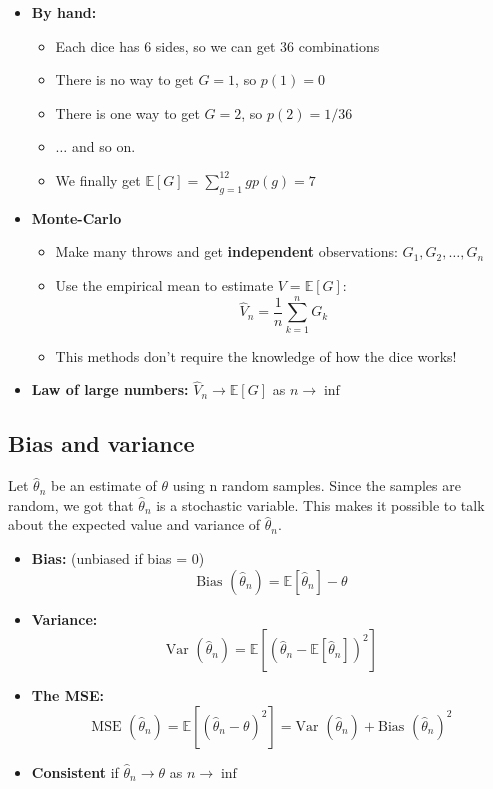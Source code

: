 \begin{itemize}
	\item \textbf{By hand:}
	\begin{itemize}
		\item Each dice has 6 sides, so we can get 36 combinations
		\item There is no way to get $G=1$, so $p(1)=0$
		\item There is one way to get $G=2$, so $p(2) = 1/36$
		\item $\ldots$ and so on. 
		\item We finally get $\mathbb{E}[G] = \sum_{g=1}^{12}gp(g) = 7$ 
	\end{itemize}
	\item \textbf{Monte-Carlo}
	\begin{itemize}
		\item Make many throws and get \textbf{independent} observations: $G_1, G_2, \ldots, G_n$
		\item Use the empirical mean to estimate $V = \mathbb{E}[G]$:
			\begin{equation}
				\hat{V}_n = \frac{1} {n} \sum_{k=1}^{n}G_k
			\end{equation}
		\item This methods don't require the knowledge of how the dice works!
	\end{itemize}
	\item \textbf{Law of large numbers: } $\hat{V}_n \rightarrow \mathbb{E}[G]$ as $n \rightarrow \inf$
\end{itemize}

\subsection{Bias and variance}
Let $\hat{\theta}_n$ be an estimate of $\theta$ using n random samples. Since the samples are random, we got that $\hat{\theta}_n$ is a stochastic variable. This makes it possible to talk about the expected value and variance of $\hat{\theta}_n$. 

\begin{itemize}
	\item \textbf{Bias: } (unbiased if bias = 0) 
		\begin{equation}
			\text{Bias }(\hat{\theta}_n) = \mathbb{E}[\hat{\theta}_n] - \theta
		\end{equation}
	\item \textbf{Variance: }
		\begin{equation}
			\text{Var }(\hat{\theta}_n) = \mathbb{E}[(\hat{\theta}_n - \mathbb{E}[\hat{\theta}_n])^{2}]
		\end{equation}
	\item \textbf{The MSE: }
		\begin{equation}
			\text{MSE }(\hat{\theta}_n) = \mathbb{E}[(\hat{\theta}_n - \theta)^{2}] = \text{Var }(\hat{\theta}_n) + \text{Bias }(\hat{\theta}_n)^{2}
		\end{equation}
	\item \textbf{Consistent } if $\hat{\theta}_n \rightarrow \theta $ as $n \rightarrow \inf$ 
\end{itemize}

